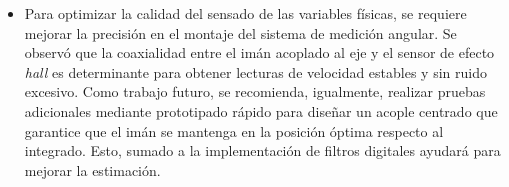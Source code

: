 \begin{itemize}
\item Para optimizar la calidad del sensado de las variables físicas, se requiere mejorar la precisión en el montaje del sistema de medición angular. Se observó que la coaxialidad entre el imán acoplado al eje y el sensor de efecto \textit{hall} es determinante para obtener lecturas de velocidad estables y sin ruido excesivo. Como trabajo futuro, se recomienda, igualmente, realizar pruebas adicionales mediante prototipado rápido para diseñar un acople centrado que garantice que el imán se mantenga en la posición óptima respecto al integrado. Esto, sumado a la implementación de filtros digitales ayudará para mejorar la estimación.

\end{itemize}



